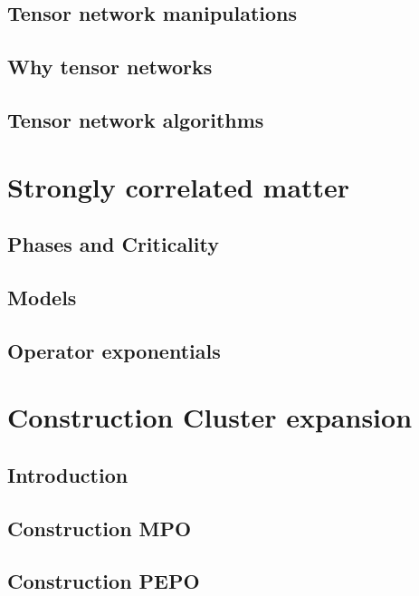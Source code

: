 \documentclass{book}
\begin{document}
\section{Tensor network manipulations}\label{sec:mpomath}


\section{ Why tensor networks}


\section{Tensor network algorithms}


\chapter{Strongly correlated matter}

\section{Phases and Criticality} \label{sec:PhasesAndCrit}


\section{Models}


\section{Operator exponentials}


\chapter{Construction Cluster expansion}

\section{Introduction}


\section{Construction MPO}


\section{Construction PEPO}

\end{document}
